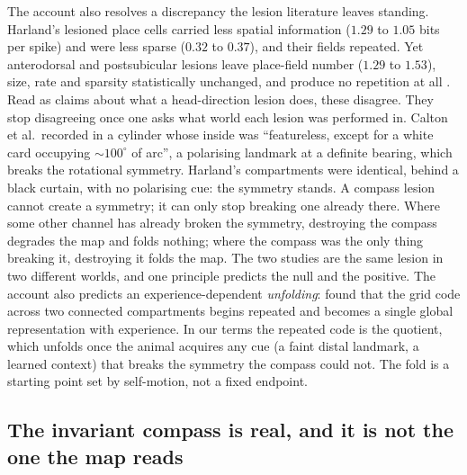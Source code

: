 \documentclass[9pt,lineno]{elife}
\begin{document}
The account also resolves a discrepancy the lesion literature leaves standing. Harland's lesioned place
cells carried less spatial information ($1.29$ to $1.05$ bits per spike) and were less sparse ($0.32$ to
$0.37$), and their fields repeated. Yet anterodorsal and postsubicular lesions leave place-field number
($1.29$ to $1.53$), size, rate and sparsity statistically unchanged, and produce no repetition at all
\citep{calton2003}. Read as claims about what a head-direction lesion does, these disagree. They stop
disagreeing once one asks what world each lesion was performed in. Calton et al.\ recorded in a cylinder
whose inside was ``featureless, except for a white card occupying $\sim 100^\circ$ of arc'', a
polarising landmark at a definite bearing, which breaks the rotational symmetry. Harland's compartments
were identical, behind a black curtain, with no polarising cue: the symmetry stands. A compass lesion
cannot create a symmetry; it can only stop breaking one already there. Where some other channel has
already broken the symmetry, destroying the compass degrades the map and folds nothing; where the compass
was the only thing breaking it, destroying it folds the map. The two studies are the same lesion in two
different worlds, and one principle predicts the null and the positive. The account also predicts an
experience-dependent \emph{unfolding}: \citet{carpenter2015} found that the grid code across two
connected compartments begins repeated and becomes a single global representation with experience. In our
terms the repeated code is the quotient, which unfolds once the animal acquires any cue (a faint
distal landmark, a learned context) that breaks the symmetry the compass could not. The fold is a
starting point set by self-motion, not a fixed endpoint.

\subsection*{The invariant compass is real, and it is not the one the map reads}
\end{document}
